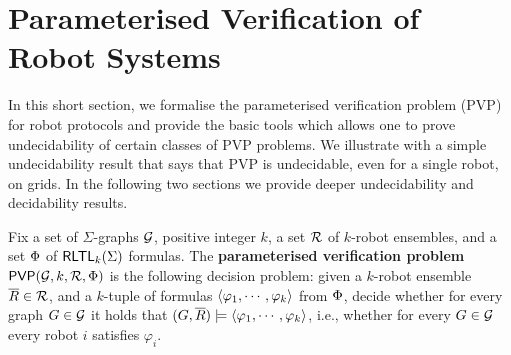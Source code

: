 




\section{Parameterised Verification of Robot Systems}

In this short section, we formalise the parameterised verification problem (PVP) for robot protocols and provide the basic tools which allows one to prove undecidability of certain classes of PVP problems. We illustrate with a simple undecidability result that says that PVP is undecidable, even for a single robot, on grids. In the following two sections we provide deeper undecidability and decidability results.
%

\begin{definition}
Fix a set of $\Sigma$-graphs $\mathcal{G}$, positive integer $k$, a set  $\mathcal{R}$ of $k$-robot ensembles, and a set $\Phi$ of $\textsf{RLTL}_k(\Sigma)$ formulas.
The \textbf{parameterised verification problem} $\mathsf{PVP}(\mathcal{G},k,\mathcal{R},\Phi)$ is the following decision problem: given a $k$-robot ensemble $\overline{R} \in \mathcal{R}$, and a $k$-tuple of \RLTL formulas $\langle {\varphi_1,\cdots,\varphi_k} \rangle$ from $\Phi$, decide whether for every graph $G \in \mathcal{G}$ it holds that $(G,\overline{R}) \models \langle {\varphi_1,\cdots,\varphi_k} \rangle$, i.e., whether for every $G \in \mathcal{G}$ every robot $i$ satisfies $\varphi_i$.
\end{definition}

